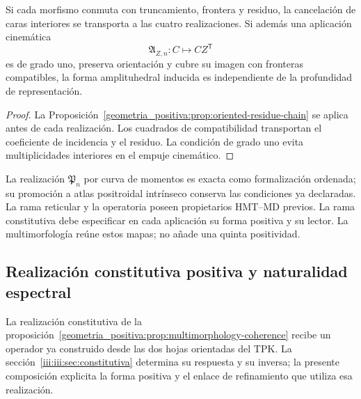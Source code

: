 \begin{proposition}
\label{geometria_positiva:prop:multimorphology-coherence}
Si cada morfismo conmuta con truncamiento, frontera y residuo, la cancelación
de caras interiores se transporta a las cuatro realizaciones. Si además una
aplicación cinemática
\[
\mathfrak A_{Z,n}:C\longmapsto CZ^{\mathsf T}
\]
es de grado uno, preserva orientación y cubre su imagen con fronteras
compatibles, la forma amplituhedral inducida es independiente de la
profundidad de representación.
\end{proposition}
\begin{proof}
La Proposición~\ref{geometria_positiva:prop:oriented-residue-chain} se aplica antes de cada
realización. Los cuadrados de compatibilidad transportan el coeficiente de
incidencia y el residuo. La condición de grado uno evita multiplicidades
interiores en el empuje cinemático.
\end{proof}

La realización \(\mathfrak P_n\) por curva de momentos es exacta como
formalización ordenada; su promoción a atlas positroidal intrínseco conserva
las condiciones ya declaradas. La rama reticular y la operatoria poseen
propietarios HMT--MD previos. La rama constitutiva debe especificar en cada
aplicación su forma positiva y su lector. La multimorfología reúne estos mapas;
no añade una quinta positividad.

\subsection{Realización constitutiva positiva y naturalidad espectral}
\label{empalme:positividad-constitutiva}

La realización constitutiva de la
proposición~\ref{geometria_positiva:prop:multimorphology-coherence} recibe
un operador ya construido desde las dos hojas orientadas del TPK. La
sección~\ref{iii:iii:sec:constitutiva} determina su respuesta y su inversa;
la presente composición explicita la forma positiva y el enlace de
refinamiento que utiliza esa realización.

